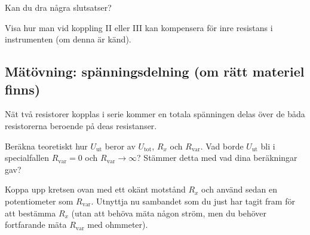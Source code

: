 \documentclass[a4paper,11pt]{article}
\begin{document}
Kan du dra några slutsatser?

Visa hur man vid koppling II eller III kan kompensera för inre resistans i instrumenten (om 
denna är känd).




\subsection*{Mätövning: spänningsdelning (om rätt materiel finns)}
Nät två resistorer kopplas i serie kommer en totala spänningen delas över
de båda resistorerna beroende på deas resistanser. 

\begin{figure}[h]
	\centering
        \resizebox{0.4\textwidth}{!}{}
\end{figure}

Beräkna teoretiskt hur $U_\mathrm{ut}$ beror av $U_\mathrm{tot}$, $R_x$ och
$R_\mathrm{var}$. Vad borde $U_\mathrm{ut}$ bli i specialfallen
$R_\mathrm{var}=0$ och $R_\mathrm{var}\rightarrow\infty$? Stämmer detta med vad
dina beräkningar gav?

Koppa upp kretsen ovan med ett okänt motstånd $R_x$ och använd sedan en
potentiometer som $R_\mathrm{var}$. Utnyttja nu sambandet
som du just har tagit fram för att bestämma $R_x$ (utan att behöva mäta någon
ström, men du behöver fortfarande mäta $R_\mathrm{var}$ med ohmmeter). 
\end{document}

